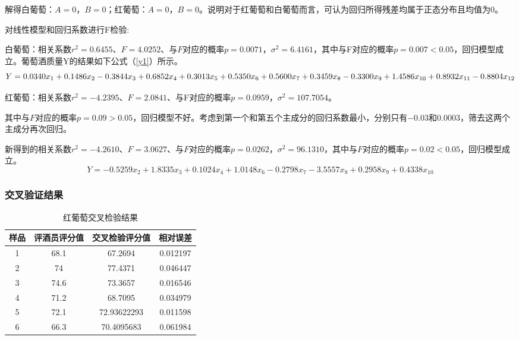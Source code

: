 \documentclass[withoutpreface,bwprint]{cumcmthesis} %
\begin{document}
\par 解得白葡萄：$A=0$，$B=0$；红葡萄：$A=0$，$B=0$。说明对于红葡萄和白葡萄而言，可认为回归所得残差均属于正态分布且均值为0。
\par 对线性模型和回归系数进行F检验:

\par 白葡萄：相关系数$r^2=0.6455$、$F=4.0252$、与$F$对应的概率$p=0.0071$，$\sigma^2=6.4161$，其中与F对应的概率$p=0.007<0.05$，回归模型成立。葡萄酒质量Y的结果如下公式（\ref{y1}）所示。
\begin{equation}
\label{y1}
Y = 0.0340x_1 +  0.1486x_2 -0.3844x_3  +  0.6852x_4 +   0.3013x_5  +  0.5350x_6  +  \\
0.5600x_7 +   0.3459x_8   -0.3300x_9  +  1.4586x_{10} +  0.8932x_{11} -0.8804x_{12}
\end{equation}

\par 红葡萄：相关系数$r^2=-4.2395$、$F=2.0841$、与F对应的概率$p=0.0959$，$\sigma^2=107.7054$。

\par 其中与$F$对应的概率$p=0.09>0.05$，回归模型不好。考虑到第一个和第五个主成分的回归系数最小，分别只有$-0.03$和$0.0003$，筛去这两个主成分再次回归。

\par 新得到的相关系数$r^2=-4.2610$、$F=3.0627$、与$F$对应的概率$p=0.0262$，$\sigma^2=96.1310$，其中与$F$对应的概率$p=0.02<0.05$，回归模型成立。
\begin{equation}
	\label{y2}
Y=  -0.5259x_2 +   1.8335 x_3 +  0.1024x_4  +  1.0148x_6   -0.2798x_7   -3.5557x_8 +   0.2958x_9+    0.4338x_{10}
\end{equation}
\subsubsection{交叉验证结果}
\begin{table}[!htbp]
\centering
\caption{红葡萄交叉检验结果}
\label{红葡萄交叉检验结果}
\begin{tabular}{cccc}
\toprule
样品&评酒员评分值&交叉检验评分值&相对误差\\
\midrule
1&68.1&67.2694&0.012197\\
2&74&77.4371&0.046447\\
3&74.6&73.3657&0.016546\\
4&71.2&68.7095&0.034979\\
5&72.1&72.93622293&0.011598\\
6&66.3&70.4095683&0.061984\\
\bottomrule 
\end{tabular}
\end{table}
\end{document}
